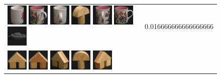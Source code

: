 {\begin{figure}[p]
\begin{tabular}{m{11cm} | m{3cm} |}
\includegraphics[width=1cm]{coil/beeld-38.eps}
\includegraphics[width=1cm]{coil/beeld-10.eps}
\includegraphics[width=1cm]{coil/beeld-41.eps}
\includegraphics[width=1cm]{coil/beeld-3.eps}
\includegraphics[width=1cm]{coil/beeld-11.eps}
\includegraphics[width=1cm]{coil/beeld-6.eps}
\includegraphics[width=1cm]{coil/beeld-24.eps}
& {\scriptsize 0.016666666666666666}
\\
\includegraphics[width=1cm]{coil/beeld-42.eps}
\includegraphics[width=1cm]{coil/beeld-43.eps}
\includegraphics[width=1cm]{coil/beeld-46.eps}
\includegraphics[width=1cm]{coil/beeld-0.eps}
\includegraphics[width=1cm]{coil/beeld-45.eps}

\end{tabular}
\end{figure}}
